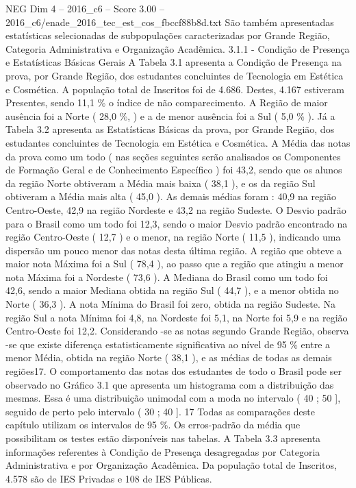 \begin{textsample}{NEG Dim 4 – 2016\_c6 – Score 3.00 – 2016\_c6/enade\_2016\_tec\_est\_cos\_fbccf88b8d.txt}
São também apresentadas estatísticas selecionadas de subpopulações caracterizadas por Grande Região, Categoria Administrativa e Organização Acadêmica. 3.1.1 - Condição de Presença e Estatísticas Básicas Gerais A Tabela 3.1 apresenta a Condição de Presença na prova, por Grande Região, dos estudantes concluintes de Tecnologia em Estética e Cosmética.
A população total de Inscritos foi de 4.686.
Destes, 4.167 estiveram Presentes, sendo 11,1 \% o índice de não comparecimento.
A Região de maior ausência foi a Norte ( 28,0 \%, ) e a de menor ausência foi a Sul ( 5,0 \% ).
Já a Tabela 3.2 apresenta as Estatísticas Básicas da prova, por Grande Região, dos estudantes concluintes de Tecnologia em Estética e Cosmética.
A Média das notas da prova como um todo ( nas seções seguintes serão analisados os Componentes de Formação Geral e de Conhecimento Específico ) foi 43,2, sendo que os alunos da região Norte obtiveram a Média mais baixa ( 38,1 ), e os da região Sul obtiveram a Média mais alta ( 45,0 ).
As demais médias foram : 40,9 na região Centro-Oeste, 42,9 na região Nordeste e 43,2 na região Sudeste.
O Desvio padrão para o Brasil como um todo foi 12,3, sendo o maior Desvio padrão encontrado na região Centro-Oeste ( 12,7 ) e o menor, na região Norte ( 11,5 ), indicando uma dispersão um pouco menor das notas desta última região.
A região que obteve a maior nota Máxima foi a Sul ( 78,4 ), ao passo que a região que atingiu a menor nota Máxima foi a Nordeste ( 73,6 ).
A Mediana do Brasil como um todo foi 42,6, sendo a maior Mediana obtida na região Sul ( 44,7 ), e a menor obtida no Norte ( 36,3 ).
A nota Mínima do Brasil foi zero, obtida na região Sudeste.
Na região Sul a nota Mínima foi 4,8, na Nordeste foi 5,1, na Norte foi 5,9 e na região Centro-Oeste foi 12,2.
Considerando -se as notas segundo Grande Região, observa -se que existe diferença estatisticamente significativa ao nível de 95 \% entre a menor Média, obtida na região Norte ( 38,1 ), e as médias de todas as demais regiões17.
O comportamento das notas dos estudantes de todo o Brasil pode ser observado no Gráfico 3.1 que apresenta um histograma com a distribuição das mesmas.
Essa é uma distribuição unimodal com a moda no intervalo ( 40 ; 50 ], seguido de perto pelo intervalo ( 30 ; 40 ]. 17 Todas as comparações deste capítulo utilizam os intervalos de 95 \%.
Os erros-padrão da média que possibilitam os testes estão disponíveis nas tabelas.
A Tabela 3.3 apresenta informações referentes à Condição de Presença desagregadas por Categoria Administrativa e por Organização Acadêmica.
Da população total de Inscritos, 4.578 são de IES Privadas e 108 de IES Públicas.

\end{textsample}
